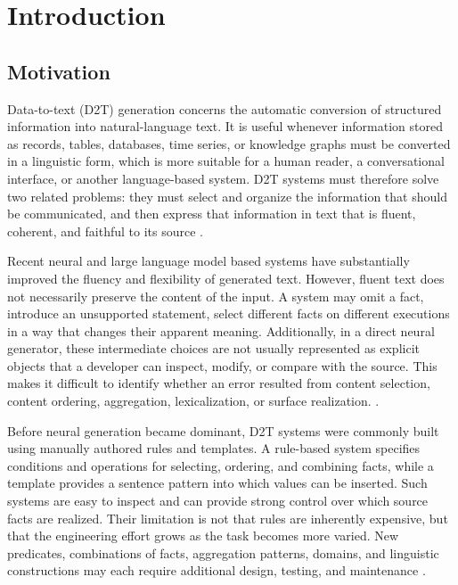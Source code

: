 
\chapter{Introduction}

\section{Motivation}

Data-to-text (D2T) generation concerns the automatic conversion of structured
information into natural-language text. It is useful whenever information stored
as records, tables, databases, time series, or knowledge graphs must be converted
in a linguistic form, which is more suitable for a human reader, a conversational
interface, or another language-based system. D2T systems must therefore solve
two related problems: they must select and organize the information that should
be communicated, and then express that information in text that is fluent,
coherent, and faithful to its source
\cite{gatt2018survey,osuji2024systematic}.

Recent neural and large language model based systems have substantially improved
the fluency and flexibility of generated text. However, fluent text does not
necessarily preserve the content of the input. A system may omit a fact,
introduce an unsupported statement, select different facts on different
executions in a way that changes their apparent
meaning. Additionally, in a direct neural generator, these intermediate choices are not usually
represented as explicit objects that a developer can inspect, modify, or compare
with the source. This makes it difficult to identify whether an error resulted
from content selection, content ordering, aggregation, lexicalization, or surface
realization.
\cite{wiseman-etal-2017-challenges,dusek-kasner-2020-evaluating,
dhingra-etal-2019-handling}.

Before neural generation became dominant, D2T systems were commonly built using
manually authored rules and templates. A rule-based system specifies conditions
and operations for selecting, ordering, and combining facts, while a template
provides a sentence pattern into which values can be inserted. Such systems are
easy to inspect and can provide strong control over which source facts are
realized. Their limitation is not that rules are inherently expensive, but that
the engineering effort grows as the task becomes more varied. New predicates,
combinations of facts, aggregation patterns, domains, and linguistic constructions
may each require additional design, testing, and maintenance
\cite{reiter1997building,gatt2018survey}.

